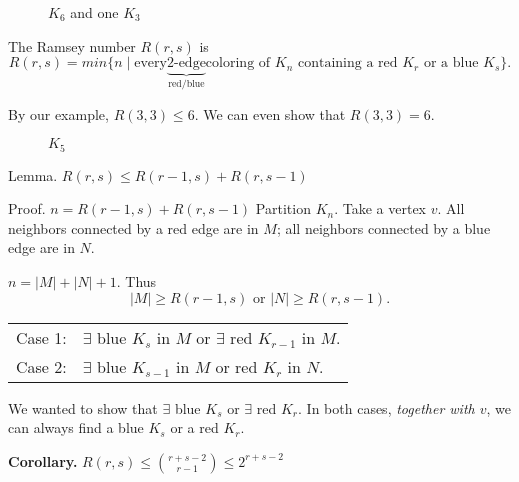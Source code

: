 \begin{figure}[htb]
  \centering
  \caption{$K_6$ and one $K_3$}
\end{figure}
\FloatBarrier


\begin{definition}
The Ramsey number $R(r,s)$ is
\[
  R(r,s) =
    min \{n\mid \text{every} \underbrace{\text{2-edge}}_{\text{red/blue}} 
    \text{coloring of $K_n$ containing a red $K_r$ or a blue $K_s$}\}.
\]
\end{definition}

By our example, $R(3,3) ≤ 6$. We can even show that $R(3,3) = 6$.

\begin{figure}[htb]
  \centering
  \caption{$K_5$}
\end{figure}

Lemma. $R(r,s) ≤ R(r-1, s) + R(r, s-1)$

Proof. $n = R(r-1, s) + R(r, s-1)$
Partition $K_n$. Take a vertex $v$. All neighbors connected by a red edge are in $M$; all neighbors connected by a blue edge are in $N$.

$n = |M|+|N|+1$. Thus
\[
  |M| ≥ R(r-1, s) \text{ or } |N| ≥ R(r, s-1).
\]

\begin{tabular}{ll}
  Case 1: & $\exists$ blue $K_s$ in $M$ or $\exists$ red $K_{r-1}$ in $M$. \\
  Case 2: & $\exists$ blue $K_{s-1}$ in $M$ or red $K_r$ in $N$.
\end{tabular}

We wanted to show that $\exists$ blue $K_s$ or $\exists$ red $K_r$.
In both cases, \emph{together with $v$}, we can always find a blue $K_s$ or a red $K_r$.

\textbf{Corollary.} $R(r,s) ≤ {r+s-2 \choose r-1} ≤ 2^{r+s-2}$

